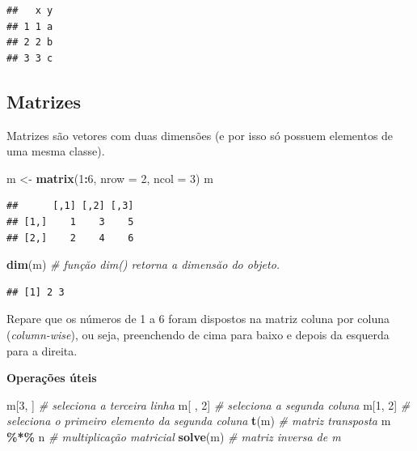 \documentclass[
]{book}
\newenvironment{Shaded}{\begin{snugshade}}{\end{snugshade}}
\newcommand{\CommentTok}[1]{\textcolor[rgb]{0.56,0.35,0.01}{\textit{#1}}}
\newcommand{\DataTypeTok}[1]{\textcolor[rgb]{0.13,0.29,0.53}{#1}}
\newcommand{\DecValTok}[1]{\textcolor[rgb]{0.00,0.00,0.81}{#1}}
\newcommand{\KeywordTok}[1]{\textcolor[rgb]{0.13,0.29,0.53}{\textbf{#1}}}
\newcommand{\NormalTok}[1]{#1}
\newcommand{\OperatorTok}[1]{\textcolor[rgb]{0.81,0.36,0.00}{\textbf{#1}}}
\newcommand{\StringTok}[1]{\textcolor[rgb]{0.31,0.60,0.02}{#1}}
\begin{document}
\begin{verbatim}
##   x y
## 1 1 a
## 2 2 b
## 3 3 c
\end{verbatim}

\hypertarget{matrizes}{%
\subsection{Matrizes}\label{matrizes}}

Matrizes são vetores com duas dimensões (e por isso só possuem elementos de uma mesma classe).

\begin{Shaded}
\begin{Highlighting}[]
\NormalTok{m <{-}}\StringTok{ }\KeywordTok{matrix}\NormalTok{(}\DecValTok{1}\OperatorTok{:}\DecValTok{6}\NormalTok{, }\DataTypeTok{nrow =} \DecValTok{2}\NormalTok{, }\DataTypeTok{ncol =} \DecValTok{3}\NormalTok{)}
\NormalTok{m}
\end{Highlighting}
\end{Shaded}

\begin{verbatim}
##      [,1] [,2] [,3]
## [1,]    1    3    5
## [2,]    2    4    6
\end{verbatim}

\begin{Shaded}
\begin{Highlighting}[]
\KeywordTok{dim}\NormalTok{(m) }\CommentTok{\# funçăo dim() retorna a dimensăo do objeto.}
\end{Highlighting}
\end{Shaded}

\begin{verbatim}
## [1] 2 3
\end{verbatim}

Repare que os números de 1 a 6 foram dispostos na matriz coluna por coluna (\emph{column-wise}), ou seja, preenchendo de cima para baixo e depois da esquerda para a direita.

\textbf{Operações úteis}

\begin{Shaded}
\begin{Highlighting}[]
\NormalTok{m[}\DecValTok{3}\NormalTok{,  ]   }\CommentTok{\# seleciona a terceira linha}
\NormalTok{m[ , }\DecValTok{2}\NormalTok{]   }\CommentTok{\# seleciona a segunda coluna}
\NormalTok{m[}\DecValTok{1}\NormalTok{, }\DecValTok{2}\NormalTok{]   }\CommentTok{\# seleciona o primeiro elemento da segunda coluna}
\KeywordTok{t}\NormalTok{(m)      }\CommentTok{\# matriz transposta}
\NormalTok{m }\OperatorTok{\%*\%}\StringTok{ }\NormalTok{n   }\CommentTok{\# multiplicação matricial}
\KeywordTok{solve}\NormalTok{(m)  }\CommentTok{\# matriz inversa de m}
\end{Highlighting}
\end{Shaded}
\end{document}
